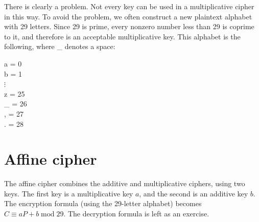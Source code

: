 \documentclass{book}
\theoremstyle{plain}
\theoremstyle{definition}
\renewcommand{\mod}{\operatorname{mod}}
\renewcommand{\mod}{\operatorname{mod}}
\begin{document}
There is clearly a problem. Not every key can be used in a multiplicative cipher in this way. To avoid the problem, we often construct a new plaintext alphabet with 29 letters. Since 29 is prime, every nonzero number less than 29 is coprime to it, and therefore is an acceptable multiplicative key. This alphabet is the following, where \_ denotes a space:
\begin{center}
a = 0 \\
b = 1 \\
$\vdots$ \\
z = 25 \\
\_ = 26 \\
, = 27 \\
. = 28
\end{center}

\section{Affine cipher}
The affine cipher combines the additive and multiplicative ciphers, using two keys. The first key is a multiplicative key $a$, and the second is an additive key $b$. The encryption formula (using the 29-letter alphabet) becomes $C \equiv aP + b \mod 29$. The decryption formula is left as an exercise.
\end{document}
